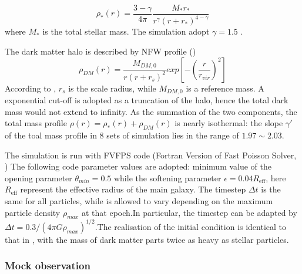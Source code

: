 \documentclass[fleqn,usenatbib]{mnras}
\begin{document}
\begin{equation}
    \label{eq:profile_stellar}
    \rho_*(r) = \frac{3-\gamma}{4\pi}\frac{M_*r_*}{r^\gamma (r+r_*)^{4-\gamma}}
\end{equation}  
where $M_*$ is the total stellar mass. The simulation adopt $\gamma = 1.5$ . 
\par The dark matter halo is described by NFW profile (\cite{NFW})
\begin{equation}
    \label{eq:profile_halo}
    \rho_{DM}(r) = \frac{M_{DM,0}}{r(r+r_s)^2} exp\left[-\left(\frac{r}{r_{vir}}\right)^2\right]
\end{equation}
According to \cite{nipoti2009}, $r_s$ is the scale radius, while $M_{DM,0}$ is a reference mass. A exponential cut-off is adopted as a truncation of the halo, hence the total dark mass would not extend to infinity. As the summation of the two components, the total mass profile $\rho(r) = \rho_*(r) + \rho_{DM}(r)$ is nearly isothermal: the slope $\gamma'$ of the toal mass profile in 8 sets of simulation lies in the range of $1.97 \sim 2.03$.

\par The simulation is run with FVFPS code (Fortran Version of Fast Poisson Solver, \cite{londrillo03,nipoti03}) The following code parameter values are adopted: minimum value of the opening parameter $\theta_{min} = 0.5$ while the softening parameter $\epsilon = 0.04 R_\text{eff}$, here $R_\text{eff}$ represent the effective radius of the main galaxy. The timestep $\Delta t$ is the same for all particles, while is allowed to vary depending on the maximum particle density $\rho_{max}$ at that epoch.In particular, the timestep can be adapted by $\Delta t = 0.3/(4\pi G \rho_{max})^{1/2}$.The realisation of the initial condition is identical to that in \cite{nipoti2009}, with the mass of dark matter parts twice as heavy as stellar particles.
\subsubsection{Mock observation}
\end{document}
